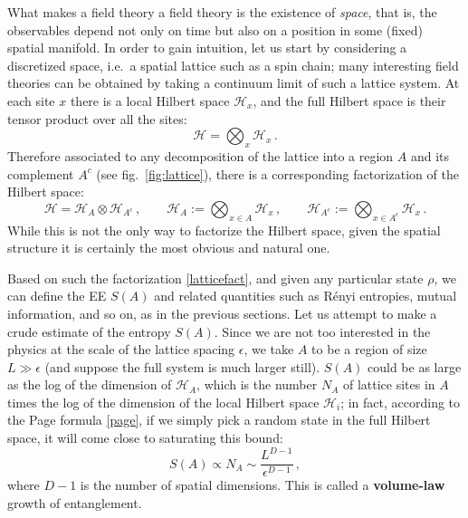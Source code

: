 \documentclass[11pt]{article}
\newcommand{\HH}{\mathcal{H}}
\begin{document}
What makes a field theory a field theory is the existence of \emph{space}, that is, the observables depend not only on time but also on a position in some (fixed) spatial manifold. In order to gain intuition, let us start by considering a discretized space, i.e.\ a spatial lattice such as a spin chain; many interesting field theories can be obtained by taking a continuum limit of such a lattice system. At each site $x$ there is a local Hilbert space $\HH_x$, and the full Hilbert space is their tensor product over all the sites:
\begin{equation}
\HH = \bigotimes_x\HH_x\,.
\end{equation}
Therefore associated to any decomposition of the lattice into a region $A$ and its complement $A^c$ (see fig.\ \ref{fig:lattice}), there is a corresponding factorization of the Hilbert space:
\begin{equation}\label{latticefact}
\HH = \HH_A\otimes\HH_{A^c}\,,\qquad
\HH_A := \bigotimes_{x\in A}\HH_x\,,\qquad
\HH_{A^c} := \bigotimes_{x\in A^c}\HH_x\,.
\end{equation}
While this is not the only way to factorize the Hilbert space, given the spatial structure it is certainly the most obvious and natural one.

Based on such the factorization \eqref{latticefact}, and given any particular state $\rho$, we can define the EE $S(A)$ and related quantities such as R\'enyi entropies, mutual information, and so on, as in the previous sections. Let us attempt to make a crude estimate of the entropy $S(A)$. Since we are not too interested in the physics at the scale of the lattice spacing $\epsilon$, we take $A$ to be a region of size $L\gg\epsilon$ (and suppose the full system is much larger still). $S(A)$ could be as large as the log of the dimension of $\HH_A$, which is the number $N_A$ of lattice sites in $A$ times the log of the dimension of the local Hilbert space $\HH_i$; in fact, according to the Page formula \eqref{page}, if we simply pick a random state in the full Hilbert space, it will come close to saturating this bound:
\begin{equation}\label{volumelaw}
S(A) \propto N_A \sim \frac{L^{D-1}}{\epsilon^{D-1}}\,,
\end{equation}
where $D-1$ is the number of spatial dimensions. This is called a \textbf{volume-law} growth of entanglement.
\end{document}
